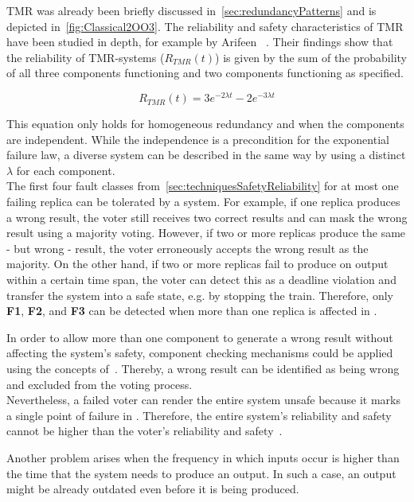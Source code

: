 \Gls*{TMR} was already been briefly discussed in~\autoref{sec:redundancyPatterns} and is depicted in~\autoref{fig:Classical2OO3}.
The reliability and safety characteristics of \gls*{TMR} have been studied in depth, for example by Arifeen \etal~\cite{ArifeenFaultTolerantTMR}.
Their findings show that the reliability of \gls*{TMR}-systems ($R_{TMR}(t)$) is given by the sum of the probability of all three components functioning and two components functioning as specified.

\begin{equation}
R_{TMR}(t) = 3e^{-2 \lambda t} - 2e^{-3 \lambda t}
\end{equation}

This equation only holds for homogeneous redundancy and when the components are independent.
While the independence is a precondition for the exponential failure law, a diverse system can be described in the same way by using a distinct $\lambda$ for each component.
\\

The first four fault classes from~\autoref{sec:techniquesSafetyReliability} for at most one failing replica can be tolerated by a  system.
For example, if one replica produces a wrong result, the voter still receives two correct results and can mask the wrong result using a majority voting.
However, if two or more replicas produce the same - but wrong - result, the voter erroneously accepts the wrong result as the majority.
On the other hand, if two or more replicas fail to produce on output within a certain time span, the voter can detect this as a deadline violation and transfer the system into a safe state, e.g. by stopping the train.
Therefore, only \textbf{F1}, \textbf{F2}, and \textbf{F3} can be detected when more than one replica is affected in .

In order to allow more than one component to generate a wrong result without affecting the system's safety, component checking mechanisms could be applied using the concepts of~\cite{DistributedSafety2020}.
Thereby, a wrong result can be identified as being wrong and excluded from the voting process.
\\

Nevertheless, a failed voter can render the entire system unsafe because it marks a single point of failure in .
Therefore, the entire system's reliability and safety cannot be higher than the voter's reliability and safety~\cite{ArifeenFaultTolerantTMR}.

Another problem arises when the frequency in which inputs occur is higher than the time that the system needs to produce an output.
In such a case, an output might be already outdated even before it is being produced.
\\

